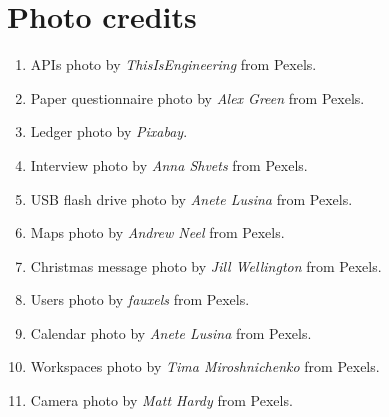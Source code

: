 \ifdefined\BRIEF
\else
    \section{Photo credits}
    \begin{enumerate}

        \item APIs photo by \textit{ThisIsEngineering} from Pexels.
        \item Paper questionnaire photo by \textit{Alex Green} from Pexels.
        \item Ledger photo by \textit{Pixabay}.
        \item Interview photo by \textit{Anna Shvets} from Pexels.
        \item USB flash drive photo by \textit{Anete Lusina} from Pexels.
        \item Maps photo by \textit{Andrew Neel} from Pexels.
        \item Christmas message photo by \textit{Jill Wellington} from Pexels.
        \item Users photo by \textit{fauxels} from Pexels.
        \item Calendar photo by \textit{Anete Lusina} from Pexels.
        \item Workspaces photo by \textit{Tima Miroshnichenko} from Pexels.
        \item Camera photo by \textit{Matt Hardy} from Pexels.

    \end{enumerate}
\fi
